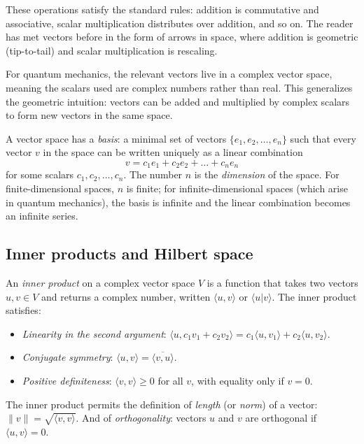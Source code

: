 These operations satisfy the standard rules: addition is
commutative and associative, scalar multiplication distributes over
addition, and so on. The reader has met vectors before in the form
of arrows in space, where addition is geometric (tip-to-tail) and
scalar multiplication is rescaling.

For quantum mechanics, the relevant vectors live in a complex vector
space, meaning the scalars used are complex numbers rather than
real. This generalizes the geometric intuition: vectors can be added
and multiplied by complex scalars to form new vectors in the same
space.

A vector space has a \emph{basis}: a minimal set of vectors
$\{e_1, e_2, \dots, e_n\}$ such that every vector $v$ in the space
can be written uniquely as a linear combination
\[
    v = c_1 e_1 + c_2 e_2 + \dots + c_n e_n
\]
for some scalars $c_1, c_2, \dots, c_n$. The number $n$ is the
\emph{dimension} of the space. For finite-dimensional spaces, $n$
is finite; for infinite-dimensional spaces (which arise in quantum
mechanics), the basis is infinite and the linear combination becomes
an infinite series.

\subsection{Inner products and Hilbert space}

An \emph{inner product} on a complex vector space $V$ is a function
that takes two vectors $u, v \in V$ and returns a complex number,
written $\langle u, v \rangle$ or $\langle u | v \rangle$. The inner
product satisfies:

\begin{itemize}[leftmargin=2em]
    \item \emph{Linearity in the second argument}:
    $\langle u, c_1 v_1 + c_2 v_2 \rangle =
     c_1 \langle u, v_1 \rangle + c_2 \langle u, v_2 \rangle$.
    \item \emph{Conjugate symmetry}:
    $\langle u, v \rangle = \overline{\langle v, u \rangle}$.
    \item \emph{Positive definiteness}: $\langle v, v \rangle \geq 0$
    for all $v$, with equality only if $v = 0$.
\end{itemize}

The inner product permits the definition of \emph{length} (or
\emph{norm}) of a vector: $\|v\| = \sqrt{\langle v, v \rangle}$.
And of \emph{orthogonality}: vectors $u$ and $v$ are orthogonal if
$\langle u, v \rangle = 0$.

